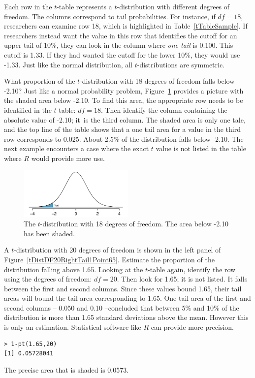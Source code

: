 Each row in the $t$-table represents a $t$-distribution with different degrees of freedom. The columns correspond to tail probabilities. For instance, if $df=18$, researchers can examine row 18, which is highlighted in Table~\ref{tTableSample}. If researchers instead want the value in this row that identifies the cutoff for an upper tail of 10\%, they can look in the column where \emph{one tail} is 0.100. This cutoff is 1.33. If they had wanted the cutoff for the lower 10\%, they would use -1.33. Just like the normal distribution, all $t$-distributions are symmetric.

\begin{example}{What proportion of the $t$-distribution with 18 degrees of freedom falls below -2.10?}
Just like a normal probability problem, Figure~\ref{tDistDF18LeftTail2Point10} provides a picture with the shaded area below -2.10. To find this area, the appropriate row needs to be identified in the $t$-table: \mbox{$df=18$}. 
Then identify the column containing the absolute value of -2.10; it~is the third column. The shaded area is only one tale, and the top line of the table shows that a one tail area for a value in the third row corresponds to 0.025. About 2.5\% of the distribution falls below -2.10. The next example encounters a case where the exact $t$ value is not listed in the table where $R$ would provide more use.
\end{example}

\begin{figure}
\centering
\includegraphics[width=0.5\textwidth]{ch_inference_foundations_oi_biostat/figures/tDistDF18LeftTail2Point10/tDistDF18LeftTail2Point10}
\caption{The $t$-distribution with 18 degrees of freedom. The area below -2.10 has been shaded.}
\label{tDistDF18LeftTail2Point10}
\end{figure}

\begin{example}{A $t$-distribution with 20 degrees of freedom is shown in the left panel of Figure~\ref{tDistDF20RightTail1Point65}. Estimate the proportion of the distribution falling above 1.65.}
Looking at the $t$-table again, identify the row using the degrees of freedom: $df=20$. Then look for 1.65; it is not listed. It falls between the first and second columns. Since these values bound 1.65, their tail areas will bound the tail area corresponding to 1.65. One tail area of the first and second columns -- 0.050 and 0.10 --concluded that between 5\% and 10\% of the distribution is more than 1.65 standard deviations above the mean. However this is only an estimation. Statistical software like $R$ can provide more precision. \begin{verbatim}
> 1-pt(1.65,20)
[1] 0.05728041
\end{verbatim}
The precise area that is shaded is 0.0573. 
\end{example}

